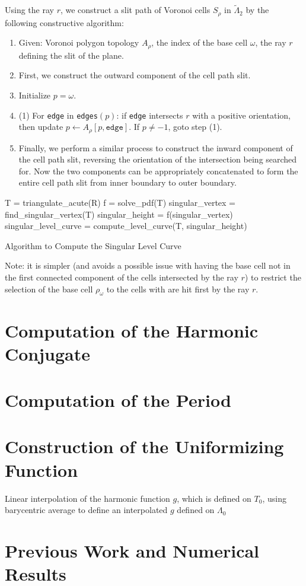 \documentclass{article}
\begin{document}
Using the ray $r$, we construct a slit path of Voronoi cells $S_\rho$ in $\tilde{\Lambda}_2$ by the following constructive algorithm:
\begin{enumerate}
	\item Given: Voronoi polygon topology $A_\rho$, the index of the base cell $\omega$, the ray $r$ defining the slit of the plane.
	\item First, we construct the outward component of the cell path slit.
	\item Initialize $p = \omega$.
	\item (1) For \texttt{edge} in \texttt{edges}$(p)$:
	if \texttt{edge} intersects $r$ with a positive orientation, then update $p \leftarrow A_\rho[p, \texttt{edge}]$. If $p \ne -1$, goto step (1).
	\item Finally, we perform a similar process to construct the inward component of the cell path slit, reversing the orientation of the intersection being searched for. Now the two components can be appropriately concatenated to form the entire cell path slit from inner boundary to outer boundary.
\end{enumerate}

\begin{algorithm}%
	\SetAlgoLined
	\LinesNumbered
	\DontPrintSemicolon
	T = triangulate\_acute(R)\;
	f = solve\_pdf(T)\;
	singular\_vertex = find\_singular\_vertex(T)\;
	singular\_height = f(singular\_vertex)\;
	singular\_level\_curve = compute\_level\_curve(T, singular\_height)\;
	\caption{Algorithm to Compute the Singular Level Curve}
\end{algorithm}

Note: it is simpler (and avoids a possible issue with having the base cell not in the first connected component of the cells intersected by the ray $r$) to restrict the selection of the base cell $\rho_\omega$ to the cells with are hit first by the ray $r$.

\section{Computation of the Harmonic Conjugate}

\section{Computation of the Period}

\section{Construction of the Uniformizing Function}

Linear interpolation of the harmonic function $g$, which is defined on $T_0$, using barycentric average to define an interpolated $g$ defined on $\Lambda_0$

\section{Previous Work and Numerical Results}
\end{document}
